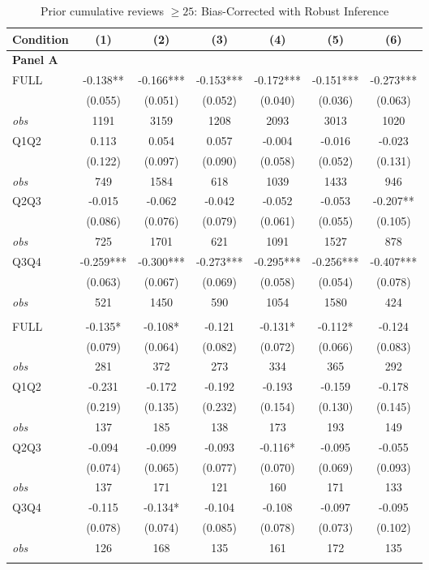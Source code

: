 \begin{table}[!htbp]
\centering
\caption{Prior cumulative reviews $\geq25$: Bias-Corrected with Robust Inference}
\begin{tabular}{lcccccc}
\toprule
Condition & (1) & (2) & (3) & (4) & (5) & (6) \\
\midrule
\multicolumn{7}{l}{\textbf{Panel A}} \\

FULL & -0.138** & -0.166*** & -0.153*** & -0.172*** & -0.151*** & -0.273*** \\
 & (0.055) & (0.051) & (0.052) & (0.040) & (0.036) & (0.063) \\
\textit{obs} & 1191 & 3159 & 1208 & 2093 & 3013 & 1020 \\
Q1Q2 & 0.113 & 0.054 & 0.057 & -0.004 & -0.016 & -0.023 \\
 & (0.122) & (0.097) & (0.090) & (0.058) & (0.052) & (0.131) \\
\textit{obs} & 749 & 1584 & 618 & 1039 & 1433 & 946 \\
Q2Q3 & -0.015 & -0.062 & -0.042 & -0.052 & -0.053 & -0.207** \\
 & (0.086) & (0.076) & (0.079) & (0.061) & (0.055) & (0.105) \\
\textit{obs} & 725 & 1701 & 621 & 1091 & 1527 & 878 \\
Q3Q4 & -0.259*** & -0.300*** & -0.273*** & -0.295*** & -0.256*** & -0.407*** \\
 & (0.063) & (0.067) & (0.069) & (0.058) & (0.054) & (0.078) \\
\textit{obs} & 521 & 1450 & 590 & 1054 & 1580 & 424 \\
\addlinespace
\multicolumn{7}{l}{\textbf{Panel B}} \\

FULL & -0.135* & -0.108* & -0.121 & -0.131* & -0.112* & -0.124 \\
 & (0.079) & (0.064) & (0.082) & (0.072) & (0.066) & (0.083) \\
\textit{obs} & 281 & 372 & 273 & 334 & 365 & 292 \\
Q1Q2 & -0.231 & -0.172 & -0.192 & -0.193 & -0.159 & -0.178 \\
 & (0.219) & (0.135) & (0.232) & (0.154) & (0.130) & (0.145) \\
\textit{obs} & 137 & 185 & 138 & 173 & 193 & 149 \\
Q2Q3 & -0.094 & -0.099 & -0.093 & -0.116* & -0.095 & -0.055 \\
 & (0.074) & (0.065) & (0.077) & (0.070) & (0.069) & (0.093) \\
\textit{obs} & 137 & 171 & 121 & 160 & 171 & 133 \\
Q3Q4 & -0.115 & -0.134* & -0.104 & -0.108 & -0.097 & -0.095 \\
 & (0.078) & (0.074) & (0.085) & (0.078) & (0.073) & (0.102) \\
\textit{obs} & 126 & 168 & 135 & 161 & 172 & 135 \\
\addlinespace
\multicolumn{7}{l}{\textbf{Panel C}} \\


\end{tabular}
\end{table}

